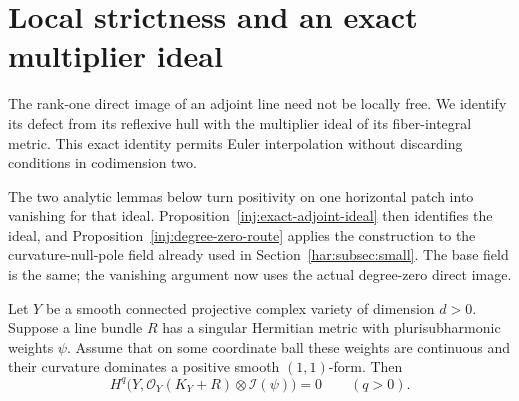 \section{Local strictness and an exact multiplier ideal}
\label{inj:localized}

The rank-one direct image of an adjoint line need not be locally free.
We identify its defect from its reflexive hull with the multiplier ideal
of its fiber-integral metric. This exact identity permits Euler
interpolation without discarding conditions in codimension two.

The two analytic lemmas below turn positivity on one horizontal patch
into vanishing for that ideal. Proposition~\ref{inj:exact-adjoint-ideal}
then identifies the ideal, and Proposition~\ref{inj:degree-zero-route}
applies the construction to the curvature-null-pole field already used
in Section~\ref{har:subsec:small}. The base field is the same; the
vanishing argument now uses the actual degree-zero direct image.

\begin{lemma}\label{inj:local-nadel}
Let $Y$ be a smooth connected projective complex variety of dimension
$d>0$.  Suppose a line bundle $R$ has a singular Hermitian metric with
plurisubharmonic weights $\psi$.  Assume that on some coordinate ball
these weights are continuous and their curvature dominates a positive
smooth $(1,1)$-form.  Then
\[
 H^q\bigl(Y,\mathcal O_Y(K_Y+R)\otimes\mathcal I(\psi)\bigr)=0
 \qquad(q>0).
\]
\end{lemma}

